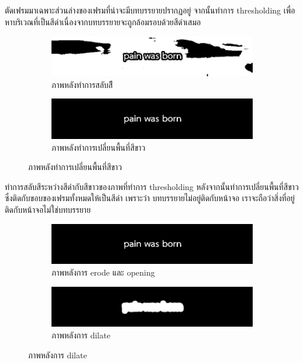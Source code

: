 \documentclass[hidelinks, a4paper,12pt]{article}
\numberwithin{equation}{section}							%
\numberwithin{equation}{section}
\begin{document}
{	\hspace{1cm} ตัดเฟรมมาเฉพาะส่วนล่างของเฟรมที่น่าจะมีบทบรรยายปรากฏอยู่ จากนั้นทำการ thresholding เพื่อหาบริเวณที่เป็นสีดำเนื่องจากบทบรรยายจะถูกล้อมรอบด้วยสีดำเสมอ
	
	\begin{figure}[H]
		\begin{subfigure}{0.4\linewidth}
			\centering
			\includegraphics[width=0.8\linewidth]{images/subtitle_detection/detection-inverse.png}
			\caption{ภาพหลังทำการสลับสีี}
		\end{subfigure}
		\begin{subfigure}{0.4\linewidth}
			\centering
			\includegraphics[width=0.8\linewidth]{images/subtitle_detection/detection-blackfill.png}
			\caption{ภาพหลังทำการเปลี่ยนพื้นที่สีขาว}
		\end{subfigure}
	\end{figure}
	
\hspace{1cm} 	ทำการสลับสีระหว่างสีดำกับสีขาวของภาพที่ทำการ thresholding หลังจากนั้นทำการเปลี่ยนพื้นที่สีขาวซึ่งติดกับขอบของเฟรมทั้งหมดให้เป็นสีดำ เพราะว่า บทบรรยายไม่อยู่ติดกับหน้าจอ เราจะถือว่าสิ่งที่อยู่ติดกับหน้าจอไม่ใช่บทบรรยาย
	
	\begin{figure}[H]
		\begin{subfigure}{0.4\linewidth}
			\centering
			\includegraphics[width=0.8\linewidth]{images/subtitle_detection/detection-erode-opening.png}
			\caption{ภาพหลังการ erode และ opening}
		\end{subfigure}
		\begin{subfigure}{0.4\linewidth}
			\centering
			\includegraphics[width=0.8\linewidth]{images/subtitle_detection/detection-stoke.png}
			\caption{ภาพหลังการ dilate}
		\end{subfigure}
	\end{figure}
	
}
\end{document}
